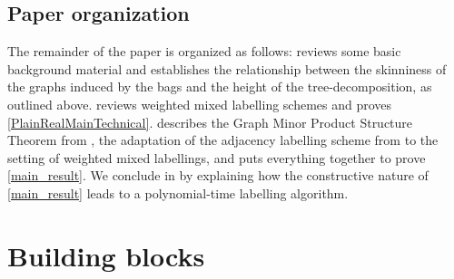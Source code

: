 \documentclass{patmorin}
\begin{document}

\subsection{Paper organization}

  The remainder of the paper is organized as follows:   reviews some basic background material and establishes the relationship between  the skinniness of the graphs induced by the bags and the height of the tree-decomposition, as outlined above.    reviews weighted mixed labelling schemes and proves \cref{PlainRealMainTechnical}.  describes the Graph Minor Product Structure Theorem from \cite{dujmovic.joret.ea:planar}, the adaptation of the adjacency labelling scheme from \cite{dujmovic.esperet.ea:adjacency} to the setting of weighted mixed labellings, and puts everything together to prove \cref{main_result}. We conclude in  by explaining how the constructive nature of \cref{main_result} leads to a
polynomial-time labelling algorithm.

  \section{Building blocks}\label{building_blocks}
\end{document}
